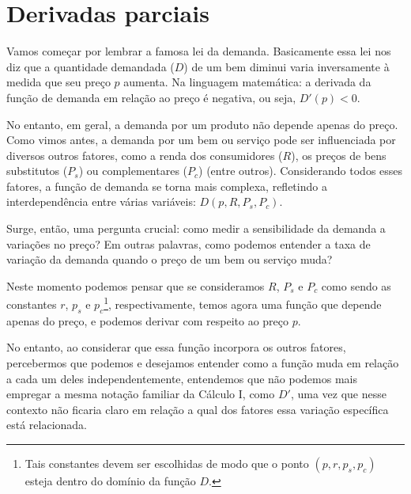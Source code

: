 \setcounter{chapter}{3}

\chapter{Derivadas parciais}



Vamos começar por lembrar a famosa lei da demanda. Basicamente essa lei nos diz que a quantidade demandada ($D$) de um bem diminui varia inversamente à medida que seu preço $p$ aumenta. Na linguagem matemática: a derivada da função de demanda em relação ao preço é negativa, ou seja, $D'(p)<0$. 

No entanto, em geral, a demanda por um produto não depende apenas do preço. 
Como vimos antes, a demanda por um bem ou serviço pode ser influenciada por diversos outros fatores, como a renda dos consumidores (\(R\)), os preços de bens substitutos (\(P_s\)) ou complementares (\(P_c\)) (entre outros). Considerando todos esses fatores, a função de demanda se torna mais complexa, refletindo a interdependência entre várias variáveis: \(D(p, R, P_s, P_c)\). 

Surge, então, uma pergunta crucial: como medir a sensibilidade da demanda a variações no preço? Em outras palavras, como podemos entender a taxa de variação da demanda quando o preço de um bem ou serviço muda? 

Neste momento podemos pensar que se consideramos $R$, $P_s$ e $P_c$ como sendo as constantes $r$, $p_s$ e $p_c$\footnote{Tais constantes devem ser escolhidas de modo que o ponto $(p,r,p_s,p_c)$ esteja dentro do domínio da função $D$.}, respectivamente, temos agora uma função que depende apenas do preço, e podemos derivar com respeito ao preço $p$. 

No entanto, ao considerar que essa função incorpora os outros fatores, percebermos que podemos e desejamos entender como a função muda em relação a cada um deles independentemente, entendemos que não podemos mais empregar a mesma notação familiar da Cálculo I, como \(D'\), uma vez que nesse contexto não ficaria claro em relação a qual dos fatores essa variação específica está relacionada. 

